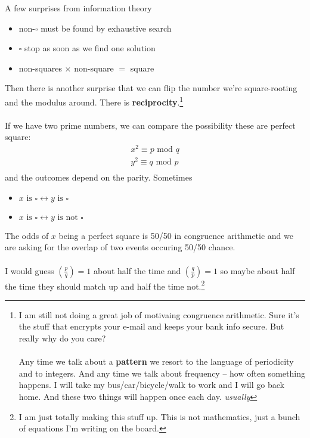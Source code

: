 \documentclass[12pt]{article}
\begin{document}
\noindent A few surprises from information theory
\begin{itemize}
\item non-$\square$ must be found by exhaustive search
\item $\square$ stop as soon as we find one solution
\item non-squares $\times$ non-square $=$ square
\end{itemize}
Then there is another surprise that we can flip the number we're square-rooting and the modulus around.  There is \textbf{reciprocity}.\footnote{I am still not doing a great job of motivaing congruence arithmetic.  Sure it's the stuff that encrypts your e-mail and keeps your bank info secure.  But really why do you care?  \\ \\
Any time we talk about a \textbf{pattern} we resort to the language of periodicity and to integers.  And any time we talk about frequency -- how often something happens.  I will take my bus/car/bicycle/walk to work and I will go back home.  And these two things will happen once each day.  \textit{usually}} \\ \\
If we have two prime numbers, we can compare the possibility these are perfect square:
\begin{eqnarray*}
x^2 \equiv p \text{ mod }q \\
y^2 \equiv q \text{ mod }p \\
\end{eqnarray*}
and the outcomes depend on the parity.  Sometimes
\begin{itemize}
\item $x \text{ is }\square\leftrightarrow y\text{ is }\square$
\item $x \text{ is }\square \leftrightarrow y\text{ is not }\square$
\end{itemize}
\newpage 


\noindent The odds of $x$ being a perfect square is 50/50 in congruence arithmetic and we are asking for the overlap of two events occuring 50/50 chance. \\ \\
I would guess $(\frac{p}{q}) = 1$ about half the time and   $(\frac{q}{p}) = 1$ so maybe about half the time they should match up and half the time not.\footnote{I am just totally making this stuff up.  This is not mathematics, just a bunch of equations I'm writing on the board.}

\newpage
\end{document}
